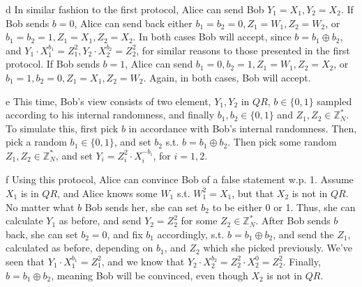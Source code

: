 \documentclass{article}
\begin{document}
\begin{paragraph}
    d In similar fashion to the first protocol, Alice can send Bob \(Y_1 = X_1, Y_2 = X_2\). If Bob sends \(b = 0\), Alice can send back either \(b_1 = b_2 = 0, Z_1 = W_1, Z_2 = W_2\), or \(b_1 = b_2 = 1, Z_1 = X_1, Z_2 = X_2\). In both cases Bob will accept, since \(b = b_1 \oplus b_2\), and \(Y_1 \cdot X_1 ^ {b_1} = Z_1^2, Y_2 \cdot X_2 ^{b_2} = Z_2^2\), for similar reasons to those presented in the first protocol. If Bob sends \(b = 1\), Alice can send \(b_1 = 0, b_2 = 1, Z_1 = W_1, Z_2 = X_2\), or \(b_1 = 1, b_2 = 0, Z_1 = X_1, Z_2 = W_2\). Again, in both cases, Bob will accept.
\end{paragraph}

\begin{paragraph}
    e This time, Bob's view consists of two element, \(Y_1, Y_2\) in \(QR\), \(b \in \{0, 1\}\) sampled according to his internal randomness, and finally \(b_1, b_2 \in \{0, 1\}\) and \(Z_1, Z_2 \in \mathbb{Z}^*_N\). To simulate this, first pick \(b\) in accordance with Bob's internal randomness. Then, pick a random \(b_1 \in \{0, 1\}\), and set \(b_2\) s.t. \(b = b_1 \oplus b_2\). Then pick some random \(Z_1, Z_2 \in \mathbb{Z}^*_N\), and set \(Y_i = Z_i^2 \cdot X_i^{-b_i}\), for \(i = 1, 2\).
\end{paragraph}

\begin{paragraph}
    f Using this protocol, Alice can convince Bob of a false statement w.p. 1. Assume \(X_1\) is in \(QR\), and Alice knows some \(W_1\) s.t. \(W_1^2 = X_1\), but that \(X_2\) is not in \(QR\). No matter what \(b\) Bob sends her, she can set \(b_2\) to be either 0 or 1. Thus, she can calculate \(Y_1\) as before, and send \(Y_2 = Z_2^2\) for some \(Z_2 \in \mathbb{Z}^*_N\). After Bob sends \(b\) back, she can set \(b_2 = 0\), and fix \(b_1\) accordingly, s.t. \(b = b_1 \oplus b_2\), and send the \(Z_1\), calculated as before, depending on \(b_1\), and \(Z_2\) which she picked previously. We've seen that \(Y_1 \cdot X_1^{b_1} = Z_1^2\), and we know that \(Y_2 \cdot X_2^{b_2} = Z_2^2 \cdot X_2^0 = Z_2^2\). Finally, \(b = b_1 \oplus b_2\), meaning Bob will be convinced, even though \(X_2\) is not in \(QR\).
\end{paragraph}
\end{document}
